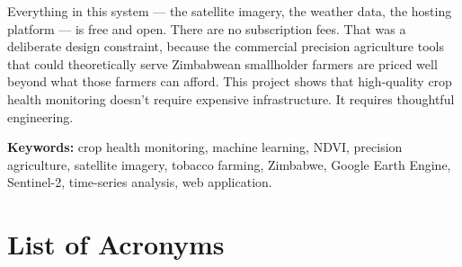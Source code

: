 \documentclass[12pt,a4paper]{report}
\begin{document}
Everything in this system — the satellite imagery, the weather data, the hosting platform — is free and open. There are no subscription fees. That was a deliberate design constraint, because the commercial precision agriculture tools that could theoretically serve Zimbabwean smallholder farmers are priced well beyond what those farmers can afford. This project shows that high-quality crop health monitoring doesn't require expensive infrastructure. It requires thoughtful engineering.

\vspace{0.5cm}
\noindent\textbf{Keywords:} crop health monitoring, machine learning, NDVI, precision agriculture,
satellite imagery, tobacco farming, Zimbabwe, Google Earth Engine, Sentinel-2, time-series analysis,
web application.

\tableofcontents
\listoffigures
\listoftables

\chapter*{List of Acronyms}
\end{document}
